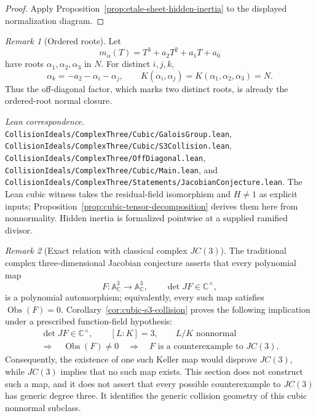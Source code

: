\documentclass[11pt]{article}
\theoremstyle{remark}
\newtheorem*{remark}{Remark}
\theoremstyle{definition}
\newcommand{\A}{\mathbb A}
\newcommand{\C}{\mathbb C}
\newcommand{\Obs}{\operatorname{Obs}}
\newcommand{\leanpath}[1]{\texttt{\nolinkurl{#1}}}
\newenvironment{leanfiles}
  {\par\medskip\begingroup\footnotesize\raggedright\noindent
   \textit{Lean correspondence.}\ }
  {\par\endgroup\medskip}
\begin{document}
\begin{proof}
Apply Proposition~\ref{prop:etale-sheet-hidden-inertia} to the displayed
normalization diagram.
\end{proof}

\begin{remark}[Ordered roots]
Let
\[
  m_\alpha(T)=T^3+a_2T^2+a_1T+a_0
\]
have roots \(\alpha_1,\alpha_2,\alpha_3\) in \(N\).  For distinct
\(i,j,k\),
\[
  \alpha_k=-a_2-\alpha_i-\alpha_j,
  \qquad
  K(\alpha_i,\alpha_j)
  =
  K(\alpha_1,\alpha_2,\alpha_3)
  =
  N.
\]
Thus the off-diagonal factor, which marks two distinct roots, is already
the ordered-root normal closure.
\end{remark}

\begin{leanfiles}
\leanpath{CollisionIdeals/ComplexThree/Cubic/GaloisGroup.lean},
\leanpath{CollisionIdeals/ComplexThree/Cubic/S3Collision.lean},
\leanpath{CollisionIdeals/ComplexThree/OffDiagonal.lean},
\leanpath{CollisionIdeals/ComplexThree/Cubic/Main.lean}, and
\leanpath{CollisionIdeals/ComplexThree/Statements/JacobianConjecture.lean}.  The
Lean cubic witness takes the residual-field isomorphism and
\(H\neq1\) as explicit inputs; Proposition~\ref{prop:cubic-tensor-decomposition}
derives them here from nonnormality.  Hidden inertia is formalized
pointwise at a supplied ramified divisor.
\end{leanfiles}

\begin{remark}[Exact relation with classical complex \(JC(3)\)]
\label{rem:exact-relation-jc3}
The traditional complex three-dimensional Jacobian conjecture asserts that
every polynomial map
\[
  F\colon\A^3_{\C}\longrightarrow\A^3_{\C},
  \qquad
  \det JF\in\C^\times,
\]
is a polynomial automorphism; equivalently, every such map satisfies
\(\Obs(F)=0\).  Corollary~\ref{cor:cubic-s3-collision} proves the following
implication under a prescribed function-field hypothesis:
\[
  \begin{gathered}
    \det JF\in\C^\times,\qquad [L:K]=3,\qquad
    L/K\text{ nonnormal}\\
    \Longrightarrow\quad \Obs(F)\neq0
    \quad\Longrightarrow\quad
    F\text{ is a counterexample to }JC(3).
  \end{gathered}
\]
Consequently, the existence of one such Keller map would disprove
\(JC(3)\), while \(JC(3)\) implies that no such map exists.  This section
does not construct such a map, and it does not assert that every possible
counterexample to \(JC(3)\) has generic degree three.  It identifies the
generic collision geometry of this cubic nonnormal subclass.
\end{remark}
\end{document}
